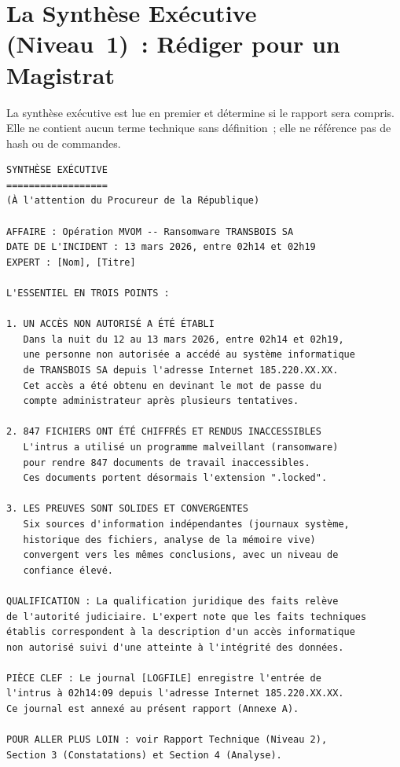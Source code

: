 \section{La Synthèse Exécutive (Niveau~1)~: Rédiger pour un Magistrat}
\label{sec:synthese-executive}

La synthèse exécutive est lue en premier et détermine si le rapport
sera compris. Elle ne contient aucun terme technique sans définition~;
elle ne référence pas de hash ou de commandes.

\begin{lstlisting}[language=bash_forensique,
    caption={Modèle de synthèse exécutive --- cas MVOM}]
SYNTHÈSE EXÉCUTIVE
==================
(À l'attention du Procureur de la République)

AFFAIRE : Opération MVOM -- Ransomware TRANSBOIS SA
DATE DE L'INCIDENT : 13 mars 2026, entre 02h14 et 02h19
EXPERT : [Nom], [Titre]

L'ESSENTIEL EN TROIS POINTS :

1. UN ACCÈS NON AUTORISÉ A ÉTÉ ÉTABLI
   Dans la nuit du 12 au 13 mars 2026, entre 02h14 et 02h19,
   une personne non autorisée a accédé au système informatique
   de TRANSBOIS SA depuis l'adresse Internet 185.220.XX.XX.
   Cet accès a été obtenu en devinant le mot de passe du
   compte administrateur après plusieurs tentatives.

2. 847 FICHIERS ONT ÉTÉ CHIFFRÉS ET RENDUS INACCESSIBLES
   L'intrus a utilisé un programme malveillant (ransomware)
   pour rendre 847 documents de travail inaccessibles.
   Ces documents portent désormais l'extension ".locked".

3. LES PREUVES SONT SOLIDES ET CONVERGENTES
   Six sources d'information indépendantes (journaux système,
   historique des fichiers, analyse de la mémoire vive)
   convergent vers les mêmes conclusions, avec un niveau de
   confiance élevé.

QUALIFICATION : La qualification juridique des faits relève
de l'autorité judiciaire. L'expert note que les faits techniques
établis correspondent à la description d'un accès informatique
non autorisé suivi d'une atteinte à l'intégrité des données.

PIÈCE CLEF : Le journal [LOGFILE] enregistre l'entrée de
l'intrus à 02h14:09 depuis l'adresse Internet 185.220.XX.XX.
Ce journal est annexé au présent rapport (Annexe A).

POUR ALLER PLUS LOIN : voir Rapport Technique (Niveau 2),
Section 3 (Constatations) et Section 4 (Analyse).
\end{lstlisting}

